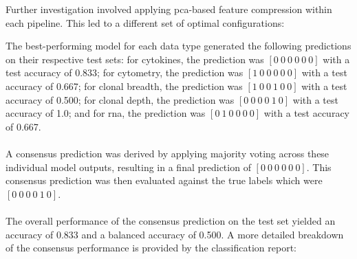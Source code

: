 \documentclass[12pt,a4paper]{report}
\begin{document}
\noindent
Further investigation involved applying \gls{pca}-based feature compression within each pipeline. This led to a different set of optimal configurations:
\begin{table}[H]
    \centering
    \hspace*{-1cm}
    \caption[Optimal Modeling Configurations Compressed Features]{Optimal Modeling Configurations for Compressed Features}
    \label{tab:optimal_configs_compressed}
\end{table}
\noindent
The best-performing model for each data type generated the following predictions on their respective test sets: for cytokines, the prediction was $[0\ 0\ 0\ 0\ 0\ 0]$ with a test accuracy of 0.833; for cytometry, the prediction was $[1\ 0\ 0\ 0\ 0\ 0]$ with a test accuracy of 0.667; for clonal breadth, the prediction was $[1\ 0\ 0\ 1\ 0\ 0]$ with a test accuracy of 0.500; for clonal depth, the prediction was $[0\ 0\ 0\ 0\ 1\ 0]$ with a test accuracy of 1.0; and for \acrshort{rna}, the prediction was $[0\ 1\ 0\ 0\ 0\ 0]$ with a test accuracy of 0.667.\\
\\
A consensus prediction was derived by applying majority voting across these individual model outputs, resulting in a final prediction of $[0\ 0\ 0\ 0\ 0\ 0]$. This consensus prediction was then evaluated against the true labels which were $[0\ 0\ 0\ 0\ 1\ 0]$.\\
\\
The overall performance of the consensus prediction on the test set yielded an accuracy of 0.833 and a balanced accuracy of 0.500. A more detailed breakdown of the consensus performance is provided by the classification report: 
\end{document}
